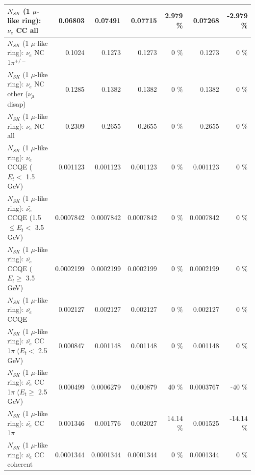 \begin{table}
\begin{tabular}{| l | r | r | r  r | r  r |}
                                  $N_{SK}$ (1 $\mu$-like ring): $\nu_{e}$ CC all &         0.06803 &         0.07491 &         0.07715 &    2.979 \%  &         0.07268 &   -2.979 \%  \\ 
\hline
                           $N_{SK}$ (1 $\mu$-like ring): $\nu_e$ NC 1$\pi^{+/-}$ &          0.1024 &          0.1273 &          0.1273 &        0 \%  &          0.1273 &        0 \%  \\ 
                $N_{SK}$ (1 $\mu$-like ring): $\nu_e$ NC other ($\nu_\mu$ disap) &          0.1285 &          0.1382 &          0.1382 &        0 \%  &          0.1382 &        0 \%  \\ 
                                  $N_{SK}$ (1 $\mu$-like ring): $\nu_{e}$ NC all &          0.2309 &          0.2655 &          0.2655 &        0 \%  &          0.2655 &        0 \%  \\ 
\hline
\hline
\hline
            $N_{SK}$ (1 $\mu$-like ring): $\bar{\nu_e}$ CCQE ($E_{t} <$ 1.5 GeV) &        0.001123 &        0.001123 &        0.001123 &        0 \%  &        0.001123 &        0 \%  \\ 
   $N_{SK}$ (1 $\mu$-like ring): $\bar{\nu_e}$ CCQE (1.5 $\leq E_{t} <$ 3.5 GeV) &       0.0007842 &       0.0007842 &       0.0007842 &        0 \%  &       0.0007842 &        0 \%  \\ 
         $N_{SK}$ (1 $\mu$-like ring): $\bar{\nu_e}$ CCQE ($E_{t} \geq$ 3.5 GeV) &       0.0002199 &       0.0002199 &       0.0002199 &        0 \%  &       0.0002199 &        0 \%  \\ 
\hline
                                $N_{SK}$ (1 $\mu$-like ring): $\bar{\nu_e}$ CCQE &        0.002127 &        0.002127 &        0.002127 &        0 \%  &        0.002127 &        0 \%  \\ 
\hline
       $N_{SK}$ (1 $\mu$-like ring): $\bar{\nu_e}$ CC 1$\pi$ ($E_{t} <$ 2.5 GeV) &        0.000847 &        0.001148 &        0.001148 &        0 \%  &        0.001148 &        0 \%  \\ 
    $N_{SK}$ (1 $\mu$-like ring): $\bar{\nu_e}$ CC 1$\pi$ ($E_{t} \geq$ 2.5 GeV) &        0.000499 &       0.0006279 &        0.000879 &       40 \%  &       0.0003767 &      -40 \%  \\ 
\hline
                           $N_{SK}$ (1 $\mu$-like ring): $\bar{\nu_e}$ CC 1$\pi$ &        0.001346 &        0.001776 &        0.002027 &    14.14 \%  &        0.001525 &   -14.14 \%  \\ 
                         $N_{SK}$ (1 $\mu$-like ring): $\bar{\nu_e}$ CC coherent &       0.0001344 &       0.0001344 &       0.0001344 &        0 \%  &       0.0001344 &        0 \%  \\ 

\end{tabular}
\end{table}
